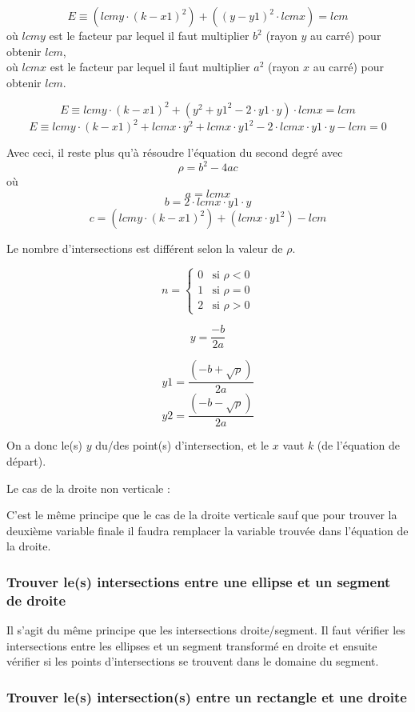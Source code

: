\documentclass[]{article}
\begin{document}
$$ E \equiv (lcmy \cdot (k - x1)^2) + ((y - y1)^2 \cdot lcmx) = lcm $$  
où $lcmy$ est le facteur par lequel il faut multiplier
$b^2$ (rayon $y$ au carré) pour obtenir $lcm$, \\
où $lcmx$ est le facteur par lequel il faut multiplier
$a^2$ (rayon $x$ au carré) pour obtenir $lcm$.

$$ E \equiv lcmy \cdot (k-x1)^2 + (y^2 + y1^2 - 2 \cdot y1 \cdot y)
\cdot lcmx = lcm$$
$$ E \equiv lcmy \cdot (k-x1)^2 + lcmx \cdot y^2 + lcmx \cdot
y1^2 - 2 \cdot lcmx \cdot y1 \cdot y - lcm = 0 $$

Avec ceci, il reste plus qu'à résoudre l'équation du second degré 
avec 
$$ \rho = b^2 - 4ac$$
où $$ a = lcmx $$
$$ b = 2 \cdot lcmx \cdot y1 \cdot y $$
$$ c = (lcmy \cdot (k-x1)^2) + (lcmx \cdot y1^2) - lcm $$



Le nombre d'intersections est différent selon la valeur de $\rho$.

\[
	n =
	\begin{cases}
		0 & \text{si } \rho < 0 \\
		1 & \text{si } \rho = 0 \\
		2 & \text{si } \rho > 0  
	\end{cases}
\]

$$ y = \frac {-b}{2a} $$

$$ y1 = \frac{(-b + \sqrt{\rho})}{2a} $$
$$ y2 = \frac{(-b - \sqrt{\rho})}{2a} $$

On a donc le(s) $y$ du/des point(s) d'intersection, et le $x$
vaut $k$ (de l'équation de départ).



Le cas de la droite non verticale : 


C'est le même principe que le cas de la droite verticale sauf
que pour trouver la deuxième variable finale il faudra
remplacer la variable trouvée dans l'équation de la droite.

\subsubsection{Trouver le(s) intersections entre une ellipse et un segment de droite}

Il s'agit du même principe que les intersections droite/segment.
Il faut vérifier les intersections entre les ellipses et un segment
transformé en droite et ensuite vérifier si les points d'intersections
se trouvent dans le domaine du segment.

\subsubsection{Trouver le(s) intersection(s) entre un rectangle et une droite}
\end{document}
